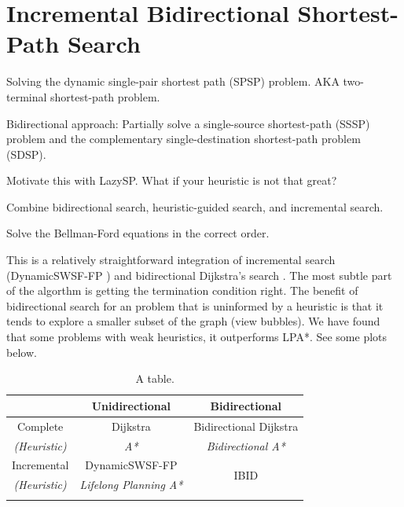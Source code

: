 \documentclass[nobib]{tufte-book}
\begin{document}
\chapter{Incremental Bidirectional Shortest-Path Search}
\label{chap:ibid}

Solving the dynamic single-pair shortest path (SPSP) problem.
AKA two-terminal shortest-path problem.

Bidirectional approach:
Partially solve a single-source shortest-path (SSSP) problem
and the complementary single-destination shortest-path problem (SDSP).

Motivate this with LazySP.
What if your heuristic is not that great?

Combine bidirectional search,
heuristic-guided search,
and incremental search.

Solve the Bellman-Ford equations in the correct order.

This is a relatively straightforward integration of incremental search
(DynamicSWSF-FP \citep{ramalingam1996})
and bidirectional Dijkstra's search \citep{goldberg2005spexternalmemory}.
The most subtle part of the algorthm is getting the termination
condition right.
The benefit of bidirectional search for an problem that is
uninformed by a heuristic
is that it tends to explore a smaller subset of the graph
(view bubbles).
We have found that some problems with weak heuristics,
it outperforms LPA*.
See some plots below.

\begin{table}
\centering
\begin{tabular}{ccc}
   \toprule
   & Unidirectional & Bidirectional \\
   \midrule
   \addlinespace[0.2em]
   Complete
      & Dijkstra \citep{dijkstra1959anote}
      & Bidirectional Dijkstra \citep{luby1989bidijk} \\
   \addlinespace[-0.2em]
   \emph{(Heuristic)}
      & \emph{A* \citep{hart1968astar}}
      & \emph{Bidirectional A* \citep{ikeda1994betterroutes}} \\
   \addlinespace[0.3em]
   Incremental
      & DynamicSWSF-FP \citep{ramalingam1996}
      & \multirow{2}{*}{IBID}  \\
   \addlinespace[-0.2em]
   \emph{(Heuristic)}
      & \emph{Lifelong Planning A* \citep{koenig2004lpastar}}
      & \\
   \addlinespace[0.2em]
   \bottomrule
\end{tabular}
\caption{A table.}
\end{table}
\end{document}
